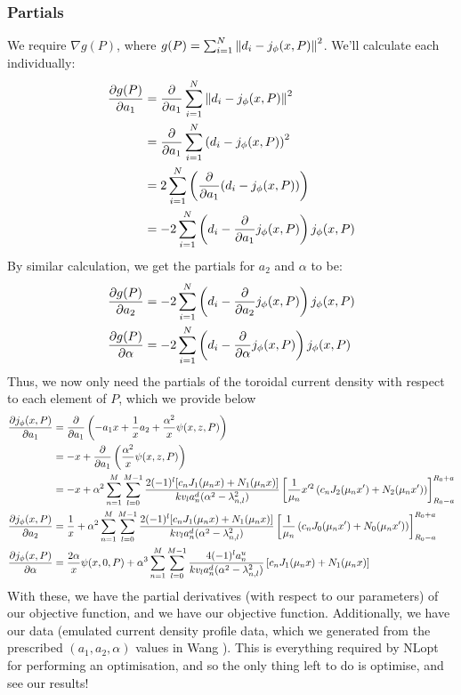 \subsubsection{Partials}
We require $\nabla g(P)$, where $g(P) = \sum_{i = 1}^{N} \norm{d_i - j_{\phi}(x, P)}^2$. We'll calculate each individually:
\begin{align*}
    \pdv{g(P)}{a_1} &= \pdv{a_1} \sum_{i = 1}^{N} \norm{d_i - j_{\phi}(x, P)}^2 \\
    &= \pdv{a_1} \sum_{i = 1}^{N} \left ( d_i - j_{\phi}(x, P) \right )^2 \\
    &= 2 \sum_{i=1}^{N} \left ( \pdv{a_1} (d_i - j_{\phi}(x, P)) \right ) \\
    &= -2 \sum_{i=1}^{N} \left ( d_i - \pdv{a_1} j_{\phi}(x, P) \right ) j_{\phi}(x, P)
\end{align*}
By similar calculation, we get the partials for $a_2$ and $\alpha$ to be:
\begin{align*}
    \pdv{g(P)}{a_2} &= -2 \sum_{i=1}^{N} \left ( d_i - \pdv{a_2} j_{\phi}(x, P) \right ) j_{\phi}(x, P) \\
    \pdv{g(P)}{\alpha} &= -2 \sum_{i=1}^{N} \left ( d_i - \pdv{\alpha} j_{\phi}(x, P) \right ) j_{\phi}(x, P)
\end{align*}
Thus, we now only need the partials of the toroidal current density with respect to each element of $P$, which we provide below
\begin{align*}
    \pdv{j_{\phi}(x, P)}{a_1} &= \pdv{a_1} \left ( -a_1 x + \frac{1}{x} a_2 + \frac{\alpha^2}{x} \psi(x, z, P) \right ) \\
    &= -x + \pdv{a_1} \left ( \frac{\alpha^2}{x} \psi(x,z, P) \right ) \\
    &= -x + \alpha^2 \sum_{n = 1}^{M} \sum_{l = 0}^{M-1} \frac{2(-1)^l [c_n J_1(\mu_n x) + N_1(\mu_n x)]}{k v_l a_n^d (\alpha^2 - \lambda_{n,l}^2)} \left [ \frac{1}{\mu_n} x'^2 \left (c_n J_2(\mu_n x') + N_2(\mu_n x') \right ) \right ]_{R_0 - a}^{R_0 + a} \\
    \pdv{j_{\phi}(x,P)}{a_2} &= \frac{1}{x} + \alpha^2 \sum_{n = 1}^{M} \sum_{l = 0}^{M-1}  \frac{2(-1)^l [c_n J_1(\mu_n x) + N_1(\mu_n x)]}{k v_l a_n^d (\alpha^2 - \lambda_{n,l}^2)} \left [ \frac{1}{\mu_n} \left ( c_n J_0(\mu_n x') + N_0(\mu_n x') \right ) \right ]_{R_0 - a}^{R_0 + a} \\
    \pdv{j_{\phi}(x,P)}{\alpha} &= \frac{2\alpha}{x} \psi(x, 0, P) + \alpha^3 \sum_{n=1}^{M} \sum_{l=0}^{M-1} \frac{4(-1)^l a_n^u}{k v_l a_n^d (\alpha^2 - \lambda_{n,l}^2)} \left [ c_n J_1(\mu_n x) + N_1(\mu_n x) \right ]
\end{align*}
With these, we have the partial derivatives (with respect to our parameters) of our objective function, and we have our objective function. 
Additionally, we have our data (emulated current density profile data, which we generated from the prescribed $(a_1, a_2, \alpha)$ values 
in Wang \cite{wang-analytic-solution}). This is everything required by NLopt for performing an optimisation, and so the only thing left to do is optimise, and see our results!


